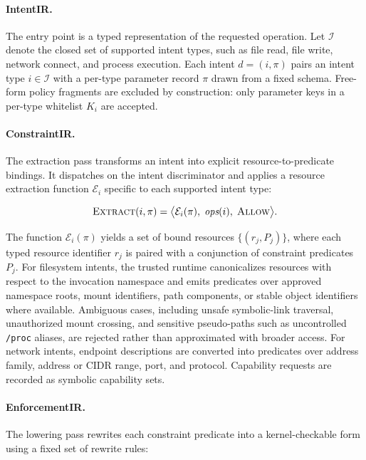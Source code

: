 \paragraph{IntentIR.}
The entry point is a typed representation of the requested operation. Let
$\mathcal{I}$ denote the closed set of supported intent types, such as file
read, file write, network connect, and process execution. Each intent
$d = (i, \pi)$ pairs an intent type $i \in \mathcal{I}$ with a per-type
parameter record $\pi$ drawn from a fixed schema. Free-form policy fragments are
excluded by construction: only parameter keys in a per-type whitelist $K_i$ are
accepted.

\paragraph{ConstraintIR.}
The extraction pass transforms an intent into explicit resource-to-predicate
bindings. It dispatches on the intent discriminator and applies a resource
extraction function $\mathcal{E}_i$ specific to each supported intent type:

\[
\textsc{Extract}(i, \pi) =
\bigl\langle
  \mathcal{E}_i(\pi),\;
  \textit{ops}(i),\;
  \textsc{Allow}
\bigr\rangle .
\]

\noindent The function $\mathcal{E}_i(\pi)$ yields a set of bound resources
$\{(r_j, P_j)\}$, where each typed resource identifier $r_j$ is paired with a
conjunction of constraint predicates $P_j$. For filesystem intents, the trusted
runtime canonicalizes resources with respect to the invocation namespace and
emits predicates over approved namespace roots, mount identifiers, path
components, or stable object identifiers where available. Ambiguous cases,
including unsafe symbolic-link traversal, unauthorized mount crossing, and
sensitive pseudo-paths such as uncontrolled \texttt{/proc} aliases, are rejected
rather than approximated with broader access. For network intents, endpoint
descriptions are converted into predicates over address family, address or CIDR
range, port, and protocol. Capability requests are recorded as symbolic
capability sets.

\paragraph{EnforcementIR.}
The lowering pass rewrites each constraint predicate into a kernel-checkable
form using a fixed set of rewrite rules:

